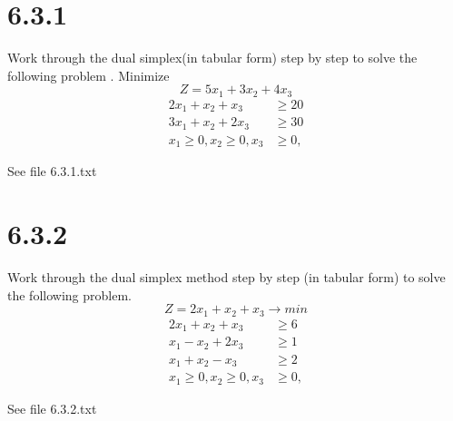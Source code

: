 \documentclass{article}
\begin{document}
\section*{6.3.1}
Work through the dual simplex(in tabular form) step by step to solve the following problem .
Minimize
\begin{equation*}
    Z = 5x_{1} + 3x_{2} + 4x_{3}
\end{equation*}
\begin{align*}
    2x_{1} + x_{2} + x_{3} &\geq 20\\
    3x_{1} + x_{2} + 2x_{3} &\geq 30\\
    x_{1} \geq 0, x_{2} \geq 0, x_{3} &\geq 0,
\end{align*}

See file 6.3.1.txt

\section*{6.3.2}
Work through the dual simplex method step by step (in tabular form) to solve the following problem.
\begin{equation*}
    Z = 2x_{1} + x_{2} + x_{3} \rightarrow min
\end{equation*}
\begin{align*}
    2x_{1} + x_{2} + x_{3} &\geq 6\\
    x_{1} - x_{2} + 2x_{3} &\geq 1\\
    x_{1} + x_{2} - x_{3} &\geq 2\\
    x_{1} \geq 0, x_{2} \geq 0, x_{3} &\geq 0,
\end{align*}

See file 6.3.2.txt
\end{document}
